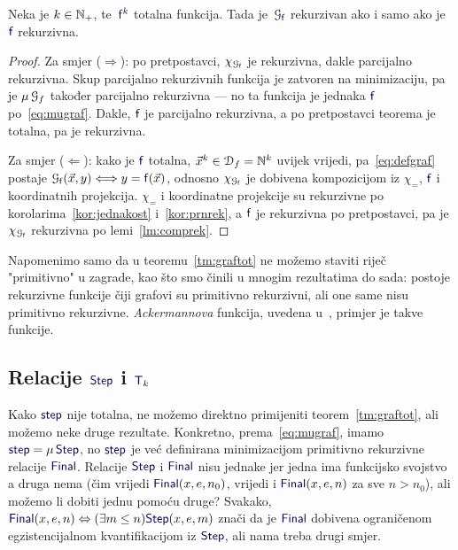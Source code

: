 \begin{teorem}\label{tm:graftot}
Neka je $k\in{\mathbb N}_+$, te\, $\f{f}^k$ totalna funkcija. Tada je\, $\graf{\f f}$ rekurzivan ako i samo ako je\, $\f f$ rekurzivna.
\end{teorem}
\begin{proof}
Za smjer ($\Rightarrow$): po pretpostavci, $\chi_{\graf{\f f}}$ je rekurzivna, dakle parcijalno rekurzivna. Skup parcijalno rekurzivnih funkcija je zatvoren na minimizaciju, pa je $\mu\,\mathcal G_{f}$ također parcijalno rekurzivna --- no ta funkcija je jednaka $\f f$ po~\eqref{eq:mugraf}. Dakle, $\f f$ je parcijalno rekurzivna, a po pretpostavci teorema je totalna, pa je rekurzivna.

Za smjer ($\Leftarrow$): kako je $\f f$ totalna, $\vec x^k\in\mathcal D_{f}={\mathbb N}^k$ uvijek vrijedi, pa~\eqref{eq:defgraf} postaje $\graf{\f f}(\vec x,y)\Longleftrightarrow y=\f f(\vec x)$, odnosno $\chi_{\graf{\f f}}$ je dobivena kompozicijom iz $\chi_=$, $\f f$ i koordinatnih projekcija. $\chi_=$ i koordinatne projekcije su rekurzivne po korolarima~\ref{kor:jednakost} i~\ref{kor:prnrek}, a $\f f$ je rekurzivna po pretpostavci, pa je $\chi_{\graf{\f f}}$ rekurzivna po lemi~\ref{lm:comprek}.
\end{proof}

Napomenimo samo da u teoremu~\ref{tm:graftot} ne možemo staviti riječ "primitivno" u zagrade, kao što smo činili u mnogim rezultatima do sada: postoje rekurzivne funkcije čiji grafovi su primitivno rekurzivni, ali one same nisu primitivno rekurzivne. \emph{Ackermannova} funkcija, uvedena u~\cite[dodatak]{skr:Vuk}, primjer je takve funkcije.

\subsection{Relacije \texorpdfstring{$\f{Step}$ i $\f T_k$}{Step i Tk}}

Kako $\f{step}$ nije totalna, ne možemo direktno primijeniti teorem~\ref{tm:graftot}, ali možemo neke druge rezultate. Konkretno, prema~\eqref{eq:mugraf}, imamo $\f{step}=\mu\,\f{Step}$, no $\f{step}$ je već definirana minimizacijom primitivno rekurzivne relacije $\f{Final}$. Relacije $\f{Step}$ i $\f{Final}$ nisu jednake jer jedna ima funkcijsko svojstvo a druga nema (čim vrijedi $\f{Final}(x,e,n_0)$, vrijedi i $\f{Final}(x,e,n)$ za sve $n>n_0$), ali možemo li dobiti jednu pomoću druge? Svakako, $\f{Final}(x,e,n)\Leftrightarrow(\exists m\le n)\f{Step}(x,e,m)$ znači da je $\f{Final}$ dobivena ograničenom egzistencijalnom kvantifikacijom iz $\f{Step}$, ali nama treba drugi smjer.


